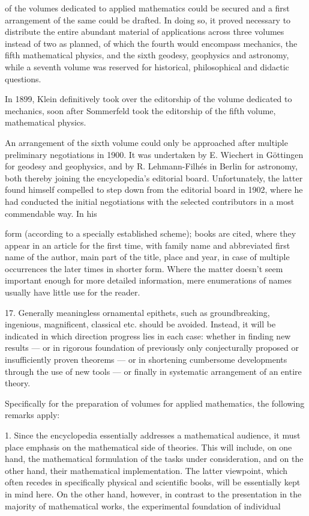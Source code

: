 \thispagestyle{fancy}

\vspace{0.5cm}

of the volumes dedicated to applied mathematics could be secured and a first arrangement of the same could be drafted. In doing so, it proved necessary to distribute the entire abundant material of applications across three volumes instead of two as planned, of which the fourth would encompass mechanics, the fifth mathematical physics, and the sixth geodesy, geophysics and astronomy, while a seventh volume was reserved for historical, philosophical and didactic questions.

In 1899, Klein definitively took over the editorship of the volume dedicated to mechanics, soon after Sommerfeld took the editorship of the fifth volume, mathematical physics.

An arrangement of the sixth volume could only be approached after multiple preliminary negotiations in 1900. It was undertaken by E. Wiechert in Göttingen for geodesy and geophysics, and by R. Lehmann-Filhés in Berlin for astronomy, both thereby joining the encyclopedia's editorial board. Unfortunately, the latter found himself compelled to step down from the editorial board in 1902, where he had conducted the initial negotiations with the selected contributors in a most commendable way. In his

\vfill
\leftline{\rule{2in}{0.4pt}}
{\footnotesize 
form (according to a specially established scheme); books are cited, where they appear in an article for the first time, with family name and abbreviated first name of the author, main part of the title, place and year, in case of multiple occurrences the later times in shorter form. Where the matter doesn't seem important enough for more detailed information, mere enumerations of names usually have little use for the reader.

17. Generally meaningless ornamental epithets, such as groundbreaking, ingenious, magnificent, classical etc. should be avoided. Instead, it will be indicated in which direction progress lies in each case: whether in finding new results — or in rigorous foundation of previously only conjecturally proposed or insufficiently proven theorems — or in shortening cumbersome developments through the use of new tools — or finally in systematic arrangement of an entire theory.

Specifically for the preparation of volumes for applied mathematics, the following remarks apply:

1. Since the encyclopedia essentially addresses a mathematical audience, it must place emphasis on the mathematical side of theories. This will include, on one hand, the mathematical formulation of the tasks under consideration, and on the other hand, their mathematical implementation. The latter viewpoint, which often recedes in specifically physical and scientific books, will be essentially kept in mind here. On the other hand, however, in contrast to the presentation in the majority of mathematical works, the experimental foundation of individual

}
